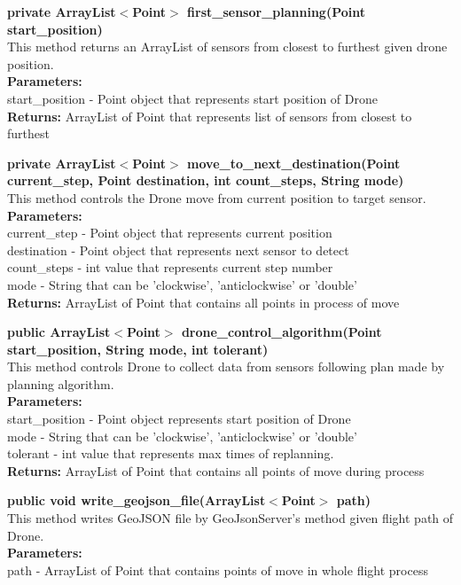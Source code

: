 \documentclass[12pt]{article}
\begin{document}
\textbf{private ArrayList$<$Point$>$ first\_sensor\_planning(Point start\_position)}\\
This method returns an ArrayList of sensors from closest to furthest given drone position.\\
\textbf{Parameters:} \\
start\_position - Point object that represents start position of Drone\\
\textbf{Returns:} ArrayList of Point that represents list of sensors from closest to furthest

\textbf{private ArrayList$<$Point$>$ move\_to\_next\_destination(Point current\_step, Point destination, int count\_steps, String mode)}\\
This method controls the Drone move from current position to target sensor.\\
\textbf{Parameters:} \\
current\_step - Point object that represents current position\\
destination - Point object that represents next sensor to detect\\
count\_steps - int value that represents current step number\\
mode - String that can be 'clockwise', 'anticlockwise' or 'double'\\
\textbf{Returns:} ArrayList of Point that contains all points in process of move

\textbf{public ArrayList$<$Point$>$ drone\_control\_algorithm(Point start\_position, String mode, int tolerant)}\\
This method controls Drone to collect data from sensors following plan made by planning algorithm.\\
\textbf{Parameters:} \\
start\_position - Point object represents start position of Drone\\
mode - String that can be 'clockwise', 'anticlockwise' or 'double'\\
tolerant - int value that represents max times of replanning.\\  
\textbf{Returns:} ArrayList of Point that contains all points of move during process

\textbf{public void write\_geojson\_file(ArrayList$<$Point$>$ path)}\\
This method writes GeoJSON file by GeoJsonServer's method given flight path of Drone.\\
\textbf{Parameters:} \\
path - ArrayList of Point that contains points of move in whole flight process
\end{document}
